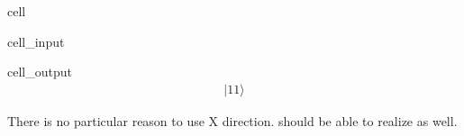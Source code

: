 \documentclass[letterpaper,10pt,english]{jupyterBook}
\begin{document}
\begin{sphinxuseclass}{cell}\begin{sphinxVerbatimInput}

\begin{sphinxuseclass}{cell_input}
\begin{sphinxVerbatim}[commandchars=\\\{\}]
\end{sphinxVerbatim}

\end{sphinxuseclass}\end{sphinxVerbatimInput}
\begin{sphinxVerbatimOutput}

\begin{sphinxuseclass}{cell_output}\begin{equation*}
\begin{split} |11\rangle\end{split}
\end{equation*}
\end{sphinxuseclass}\end{sphinxVerbatimOutput}

\end{sphinxuseclass}
\sphinxAtStartPar
There is no particular reason to use X direction.   should be able to realize  as well.
\end{document}
